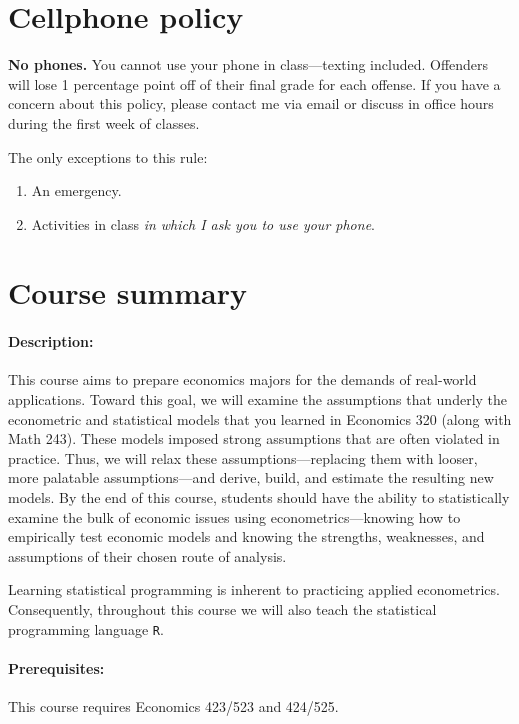 \documentclass[10pt]{article}
\begin{document}
\section*{Cellphone policy}

\textbf{No phones.} You cannot use your phone in class---texting included. Offenders will lose 1 percentage point off of their final grade for each offense. If you have a concern about this policy, please contact me via email or discuss in office hours during the first week of classes.

\bigskip \noindent The only exceptions to this rule:
\begin{enumerate}
  \item An emergency.
  \item Activities in class \textit{in which I ask you to use your phone}.
\end{enumerate}

\section*{Course summary}

\paragraph{Description:} This course aims to prepare economics majors for the demands of real-world applications. Toward this goal, we will examine the assumptions that underly the econometric and statistical models that you learned in Economics 320 (along with Math 243). These models imposed strong assumptions that are often violated in practice. Thus, we will relax these assumptions---replacing them with looser, more palatable assumptions---and derive, build, and estimate the resulting new models. By the end of this course, students should have the ability to statistically examine the bulk of economic issues using econometrics---knowing how to empirically test economic models and knowing the strengths, weaknesses, and assumptions of their chosen route of analysis.

Learning statistical programming is inherent to practicing applied econometrics. Consequently, throughout this course we will also teach the statistical programming language \texttt{{R}}.

\paragraph{Prerequisites:} This course requires Economics 423/523 and 424/525.
\end{document}
